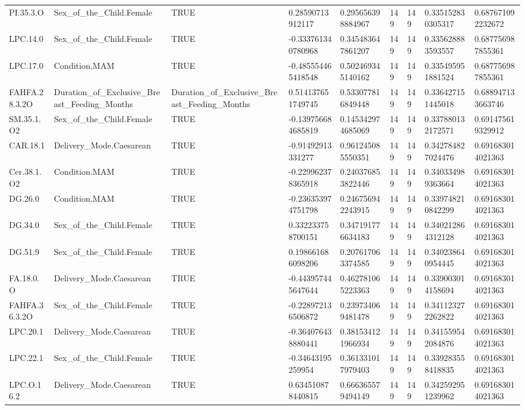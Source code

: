 \begin{longtable}{lllllllll}
PI.35.3.O & Sex\_of\_the\_Child.Female & TRUE & 0.28590713912117 & 0.295656398884967 & 149 & 149 & 0.335152830305317 & 0.687671092232672 \\
LPC.14.0 & Sex\_of\_the\_Child.Female & TRUE & -0.333761340780968 & 0.345483647861207 & 149 & 149 & 0.335628883593557 & 0.687756987855361 \\
LPC.17.0 & Condition.MAM & TRUE & -0.485554465418548 & 0.502469345140162 & 149 & 149 & 0.335495951881524 & 0.687756987855361 \\
FAHFA.28.3.2O & Duration\_of\_Exclusive\_Breast\_Feeding\_Months & Duration\_of\_Exclusive\_Breast\_Feeding\_Months & 0.514137651749745 & 0.533077816849448 & 149 & 149 & 0.336427151445018 & 0.688947133663746 \\
SM.35.1.O2 & Sex\_of\_the\_Child.Female & TRUE & -0.139756684685819 & 0.145342974685069 & 149 & 149 & 0.337880132172571 & 0.691475619329912 \\
CAR.18.1 & Delivery\_Mode.Caesarean & TRUE & -0.91492913331277 & 0.961245085550351 & 149 & 149 & 0.342784827024476 & 0.691683014021363 \\
Cer.38.1.O2 & Condition.MAM & TRUE & -0.229962378365918 & 0.240376853822446 & 149 & 149 & 0.340334989363664 & 0.691683014021363 \\
DG.26.0 & Condition.MAM & TRUE & -0.236353974751798 & 0.246756942243915 & 149 & 149 & 0.339748210842299 & 0.691683014021363 \\
DG.34.0 & Sex\_of\_the\_Child.Female & TRUE & 0.332233758700151 & 0.347191776634183 & 149 & 149 & 0.340212864312128 & 0.691683014021363 \\
DG.51.9 & Sex\_of\_the\_Child.Female & TRUE & 0.198661686098206 & 0.207617063374585 & 149 & 149 & 0.340238640954445 & 0.691683014021363 \\
FA.18.0.O & Delivery\_Mode.Caesarean & TRUE & -0.443957445647644 & 0.462781065223363 & 149 & 149 & 0.339003014158694 & 0.691683014021363 \\
FAHFA.36.3.2O & Sex\_of\_the\_Child.Female & TRUE & -0.228972136506872 & 0.239734069481478 & 149 & 149 & 0.341123272262822 & 0.691683014021363 \\
LPC.20.1 & Delivery\_Mode.Caesarean & TRUE & -0.364076438880441 & 0.381534121966934 & 149 & 149 & 0.341559542084876 & 0.691683014021363 \\
LPC.22.1 & Sex\_of\_the\_Child.Female & TRUE & -0.34643195259954 & 0.361331017979403 & 149 & 149 & 0.339283558418835 & 0.691683014021363 \\
LPC.O.16.2 & Delivery\_Mode.Caesarean & TRUE & 0.634510878440815 & 0.666365579494149 & 149 & 149 & 0.342592951239962 & 0.691683014021363 \\

\end{longtable}
